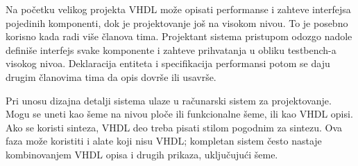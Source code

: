 Na početku velikog projekta VHDL može opisati performanse i zahteve interfejsa pojedinih komponenti, dok je projektovanje još na visokom nivou. To je posebno korisno kada radi više članova tima. Projektant sistema pristupom odozgo nadole definiše interfejs svake komponente i zahteve prihvatanja u obliku testbench-a visokog nivoa. Deklaracija entiteta i specifikacija performansi potom se daju drugim članovima tima da opis dovrše ili usavrše.

Pri unosu dizajna detalji sistema ulaze u računarski sistem za projektovanje. Mogu se uneti kao šeme na nivou ploče ili funkcionalne šeme, ili kao VHDL opisi. Ako se koristi sinteza, VHDL deo treba pisati stilom pogodnim za sintezu. Ova faza može koristiti i alate koji nisu VHDL; kompletan sistem često nastaje kombinovanjem VHDL opisa i drugih prikaza, uključujući šeme.
